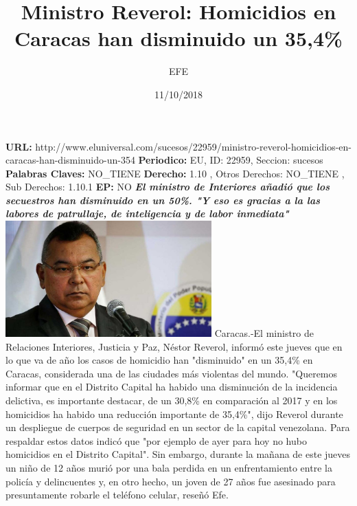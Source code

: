 \documentclass{article}%
\title{\textbf{Ministro Reverol: Homicidios en Caracas han disminuido un 35,4\%}}%
\author{EFE}%
\date{11/10/2018}%
\begin{document}
%
\normalsize%
\maketitle%
\textbf{URL: }%
http://www.eluniversal.com/sucesos/22959/ministro{-}reverol{-}homicidios{-}en{-}caracas{-}han{-}disminuido{-}un{-}354\newline%
%
\textbf{Periodico: }%
EU, %
ID: %
22959, %
Seccion: %
sucesos\newline%
%
\textbf{Palabras Claves: }%
NO\_TIENE\newline%
%
\textbf{Derecho: }%
1.10%
, Otros Derechos: %
NO\_TIENE%
, Sub Derechos: %
1.10.1%
\newline%
%
\textbf{EP: }%
NO\newline%
\newline%
%
\textbf{\textit{El ministro de Interiores añadió que los secuestros han disminuido en un 50\%. "Y eso es gracias a la las labores de patrullaje, de inteligencia y de labor inmediata"}}%
\newline%
\newline%
%
\includegraphics[width=300px]{97.jpg}%
\newline%
%
Caracas.{-}El ministro de Relaciones Interiores, Justicia y Paz, Néstor Reverol, informó este jueves que en lo que va de año los casos de homicidio han "disminuido" en un 35,4\% en Caracas, considerada una de las ciudades más violentas del mundo.%
\newline%
%
"Queremos informar que en el Distrito Capital ha habido una disminución de la incidencia delictiva, es importante destacar, de un 30,8\% en comparación al 2017 y en los homicidios ha habido una reducción importante de 35,4\%", dijo Reverol durante un despliegue de cuerpos de seguridad en un sector de la capital venezolana.%
\newline%
%
Para respaldar estos datos indicó que "por ejemplo de ayer para hoy no hubo homicidios en el Distrito Capital". \newline%
\newline%
Sin embargo, durante la mañana de este jueves un niño de 12 años murió por una bala perdida en un enfrentamiento entre la policía y delincuentes y, en otro hecho, un joven de 27 años fue asesinado para presuntamente robarle el teléfono celular, reseñó Efe.%
\end{document}
